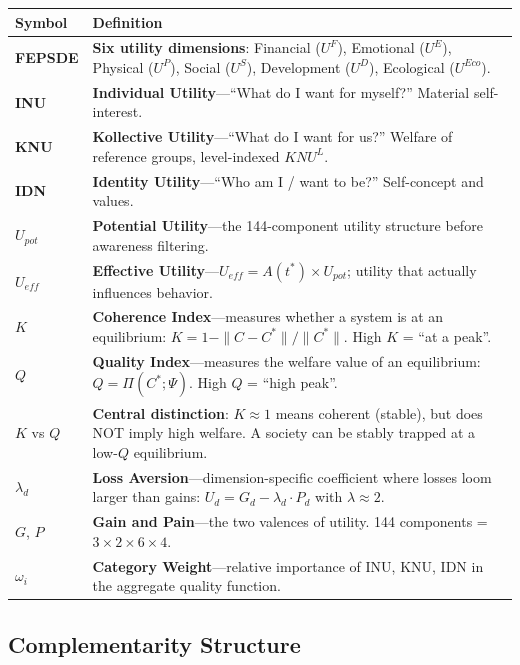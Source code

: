 \begin{longtable}{@{}p{2.8cm}p{10cm}@{}}
\toprule
\textbf{Symbol} & \textbf{Definition} \\
\midrule
\endhead
\textbf{FEPSDE} & \textbf{Six utility dimensions}: Financial ($U^F$), Emotional ($U^E$), Physical ($U^P$), Social ($U^S$), Development ($U^D$), Ecological ($U^{Eco}$). \\[6pt]
\textbf{INU} & \textbf{Individual Utility}---``What do I want for myself?'' Material self-interest. \\[6pt]
\textbf{KNU} & \textbf{Kollective Utility}---``What do I want for us?'' Welfare of reference groups, level-indexed $KNU^L$. \\[6pt]
\textbf{IDN} & \textbf{Identity Utility}---``Who am I / want to be?'' Self-concept and values. \\[6pt]
$U_{pot}$ & \textbf{Potential Utility}---the 144-component utility structure before awareness filtering. \\[6pt]
$U_{eff}$ & \textbf{Effective Utility}---$U_{eff} = A(t^*) \times U_{pot}$; utility that actually influences behavior. \\[6pt]
$K$ & \textbf{Coherence Index}---measures whether a system is at an equilibrium: $K = 1 - \|C - C^*\|/\|C^*\|$. High $K$ = ``at a peak''. \\[6pt]
$Q$ & \textbf{Quality Index}---measures the welfare value of an equilibrium: $Q = \Pi(C^*; \Psi)$. High $Q$ = ``high peak''. \\[6pt]
$K$ vs $Q$ & \textbf{Central distinction}: $K \approx 1$ means coherent (stable), but does NOT imply high welfare. A society can be stably trapped at a low-$Q$ equilibrium. \\[6pt]
$\lambda_d$ & \textbf{Loss Aversion}---dimension-specific coefficient where losses loom larger than gains: $U_d = G_d - \lambda_d \cdot P_d$ with $\lambda \approx 2$. \\[6pt]
$G$, $P$ & \textbf{Gain and Pain}---the two valences of utility. 144 components = $3 \times 2 \times 6 \times 4$. \\[6pt]
$\omega_i$ & \textbf{Category Weight}---relative importance of INU, KNU, IDN in the aggregate quality function. \\
\bottomrule
\end{longtable}

\subsection{Complementarity Structure}

